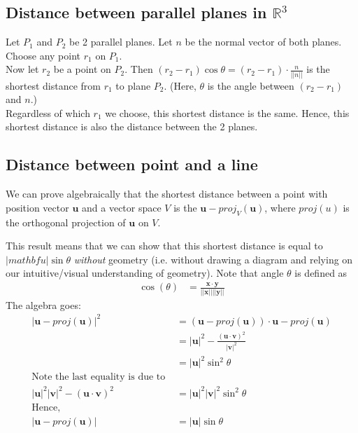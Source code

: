 \documentclass{article}
\begin{document}
\subsection{Distance between parallel planes in $\mathbb{R}^3$}
Let $P_1$ and $P_2$ be 2 parallel planes. Let $n$ be the normal vector of both planes.\\
Choose any point $r_1$ on $P_1$.\\
Now let $r_2$ be a point on $P_2$. Then $(r_2 - r_1)\cos\theta=(r_2 - r_1)\cdot \frac{n}{||n||}$ is the shortest distance from $r_1$ to plane $P_2$. (Here, $\theta$ is the angle between $(r_2-r_1)$ and $n$.)\\
Regardless of which $r_1$ we choose, this shortest distance is the same. Hence, this shortest distance is also the distance between the 2 planes.

\subsection{Distance between point and a line}
We can prove algebraically that the shortest distance between a point with position vector $\mathbf{u}$ and a vector space $V$ is the $\mathbf{u} -proj_V(\mathbf{u})$, where $proj(u)$ is the orthogonal projection of $\mathbf{u}$ on $V$.

This result means that we can show that this shortest distance is equal to $|mathbf{u}|\sin \theta$ \textit{without} geometry (i.e. without drawing a diagram and relying on our intuitive/visual understanding of geometry). Note that angle $\theta$ is defined as 
\begin{align*}
	\cos(\theta) &= \frac{\mathbf{x}\cdot \mathbf{y}}{||\mathbf{x}||||\mathbf{y}||}
\end{align*}
The algebra goes:
\begin{align*}
	|\mathbf{u}-proj(\mathbf{u})|^2&=(\mathbf{u}-proj(\mathbf{u}))\cdot \mathbf{u}-proj(\mathbf{u})\\
	&= |\mathbf{u}|^2-\frac{(\mathbf{u}\cdot \mathbf{v})^2}{|\mathbf{v}|^2}\\
	&=|\mathbf{u}|^2\sin^2\theta\\
	\text{Note the last equality is due to }\\
	|\mathbf{u}|^2|\mathbf{v}|^2-(\mathbf{u}\cdot \mathbf{v})^2&=|\mathbf{u}|^2|\mathbf{v}|^2\sin^2\theta\\
	\text{Hence, }\\ 
	|\mathbf{u}-proj(\mathbf{u})|&=|\mathbf{u}|\sin\theta
\end{align*}
\end{document}
